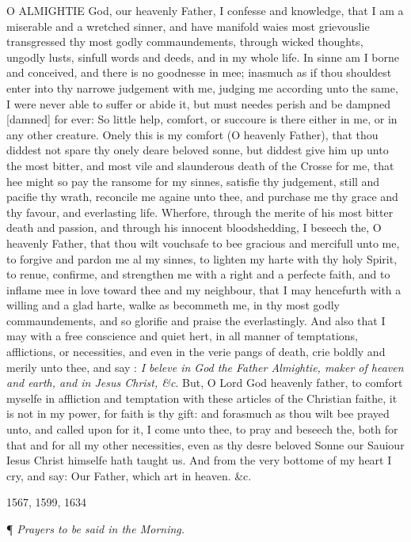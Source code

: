 O
ALMIGHTIE God, our heavenly Father, I confesse and knowledge, that I am
a miserable and a wretched sinner, and have manifold waies most grievouslie
transgressed thy most godly commaundements, through wicked thoughts, ungodly
lusts, sinfull words and deeds, and in my whole life. In sinne am I borne
and conceived, and there is no goodnesse in mee; inasmuch as if thou shouldest
enter into thy narrowe judgement with me, judging me according unto the
same, I were never able to suffer or abide it, but must needes perish
and be dampned [damned]
for ever: So little help, comfort, or succoure is there either in me,
or in any other creature. Onely this is my comfort (O heavenly Father),
that thou diddest not spare thy onely deare beloved sonne, but diddest
give him up unto the most bitter, and most vile and slaunderous death
of the Crosse for me, that hee might so pay the ransome for my sinnes,
satisfie thy judgement, still and pacifie thy wrath, reconcile me againe
unto thee, and purchase me thy grace and thy favour, and everlasting life.
Wherfore, through the merite of his most bitter death and passion, and
through his innocent bloodshedding, I beseech the, O heavenly Father,
that thou wilt vouchsafe to bee gracious and mercifull unto me, to forgive
and pardon me al my sinnes, to lighten my harte with thy holy Spirit,
to renue, confirme, and strengthen me with a right and a perfecte faith,
and to inflame mee in love toward thee and my neighbour, that I may hencefurth
with a willing and a glad harte, walke as becommeth me, in thy most godly
commaundements, and so glorifie and praise the everlastingly. And also
that I may with a free conscience and quiet hert, in all manner of temptations,
afflictions, or necessities, and even in the verie pangs of death, crie
boldly and merily unto thee, and say : \emph{I beleve in God the Father Almightie,
maker of heaven and earth, and in Jesus Christ, \&c}. But, O Lord
God heavenly father, to comfort myselfe in affliction and temptation with
these articles of the Christian faithe, it is not in my power, for faith
is thy gift: and forasmuch as thou wilt bee prayed unto, and called upon
for it, I come unto thee, to pray and beseech the, both for that and for
all my other necessities, even as thy desre beloved Sonne our Sauiour
Iesus Christ himselfe hath taught us. And from the very bottome of my
heart I cry, and say: Our Father, which art in heaven. \&c.

1567,
1599, 1634

¶
\emph{Prayers to be said in the Morning.}

